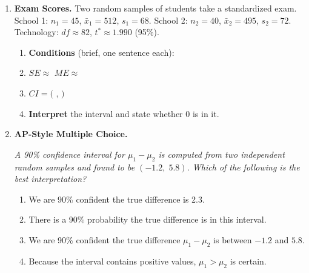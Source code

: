 \documentclass[10pt]{article}
\begin{document}
\begin{enumerate}
\begin{enumerate}[label=\alph*.]
  \item \textbf{Verify} conditions.
        \begin{itemize}
          \item Random / Independence: \writeline
          \item Normal: \writeline
        \end{itemize}
  \item $SE \approx$ \blank{3cm} \quad $CI = ($ \blank{3cm}, \blank{3cm} $)$
  \item \textbf{Interpret} and state whether the interval provides convincing evidence
        that Fertilizer A produces taller plants.
\end{enumerate}

\vspace{0.06in}

\item \textbf{Exam Scores.} \quad
Two random samples of students take a standardized exam.
School 1: $n_1 = 45$, $\bar x_1 = 512$, $s_1 = 68$.
School 2: $n_2 = 40$, $\bar x_2 = 495$, $s_2 = 72$.
Technology: $df \approx 82$, $t^* \approx 1.990$ (95\%).

\begin{enumerate}[label=\alph*.]
  \item \textbf{Conditions} (brief, one sentence each): 
  \item $SE \approx$ \blank{3cm} \quad $ME \approx$ \blank{3cm}
  \item $CI = ($ \blank{3cm}, \blank{3cm} $)$
  \item \textbf{Interpret} the interval and state whether 0 is in it. 
\end{enumerate}

\vspace{0.06in}

\item \textbf{AP-Style Multiple Choice.}

\textit{A 90\% confidence interval for $\mu_1 - \mu_2$ is computed from two independent
random samples and found to be $(-1.2,\; 5.8)$. Which of the following is the best
interpretation?}
\begin{enumerate}[label=(\Alph*)]
  \item We are 90\% confident the true difference is 2.3.
  \item There is a 90\% probability the true difference is in this interval.
  \item We are 90\% confident the true difference $\mu_1 - \mu_2$ is between $-1.2$ and $5.8$.
  \item Because the interval contains positive values, $\mu_1 > \mu_2$ is certain.
\end{enumerate}

\end{enumerate}
\end{document}
